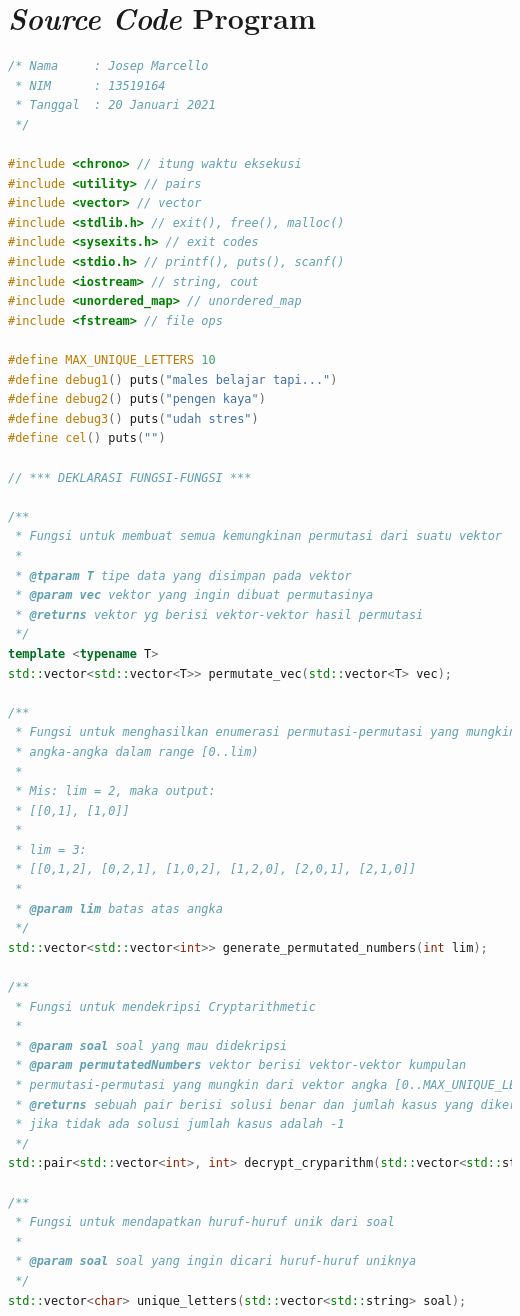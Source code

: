 \documentclass{article}
\begin{document}
\section{\textit{Source Code} Program}
\begin{lstlisting}[caption = main.cpp, language = c++]
/* Nama     : Josep Marcello
 * NIM      : 13519164
 * Tanggal  : 20 Januari 2021
 */

#include <chrono> // itung waktu eksekusi
#include <utility> // pairs
#include <vector> // vector
#include <stdlib.h> // exit(), free(), malloc()
#include <sysexits.h> // exit codes
#include <stdio.h> // printf(), puts(), scanf()
#include <iostream> // string, cout
#include <unordered_map> // unordered_map
#include <fstream> // file ops

#define MAX_UNIQUE_LETTERS 10
#define debug1() puts("males belajar tapi...")
#define debug2() puts("pengen kaya")
#define debug3() puts("udah stres")
#define cel() puts("")

// *** DEKLARASI FUNGSI-FUNGSI ***

/**
 * Fungsi untuk membuat semua kemungkinan permutasi dari suatu vektor
 *
 * @tparam T tipe data yang disimpan pada vektor
 * @param vec vektor yang ingin dibuat permutasinya
 * @returns vektor yg berisi vektor-vektor hasil permutasi
 */
template <typename T>
std::vector<std::vector<T>> permutate_vec(std::vector<T> vec);

/**
 * Fungsi untuk menghasilkan enumerasi permutasi-permutasi yang mungkin dari
 * angka-angka dalam range [0..lim)
 *
 * Mis: lim = 2, maka output:
 * [[0,1], [1,0]]
 *
 * lim = 3:
 * [[0,1,2], [0,2,1], [1,0,2], [1,2,0], [2,0,1], [2,1,0]]
 *
 * @param lim batas atas angka
 */
std::vector<std::vector<int>> generate_permutated_numbers(int lim);

/**
 * Fungsi untuk mendekripsi Cryptarithmetic
 *
 * @param soal soal yang mau didekripsi
 * @param permutatedNumbers vektor berisi vektor-vektor kumpulan
 * permutasi-permutasi yang mungkin dari vektor angka [0..MAX_UNIQUE_LETTERS]
 * @returns sebuah pair berisi solusi benar dan jumlah kasus yang dikerjakan,
 * jika tidak ada solusi jumlah kasus adalah -1
 */
std::pair<std::vector<int>, int> decrypt_cryparithm(std::vector<std::string> soal, std::vector<std::vector<int>> permutatedNumbers);

/**
 * Fungsi untuk mendapatkan huruf-huruf unik dari soal
 *
 * @param soal soal yang ingin dicari huruf-huruf uniknya
 */
std::vector<char> unique_letters(std::vector<std::string> soal);


\end{lstlisting}
\end{document}
